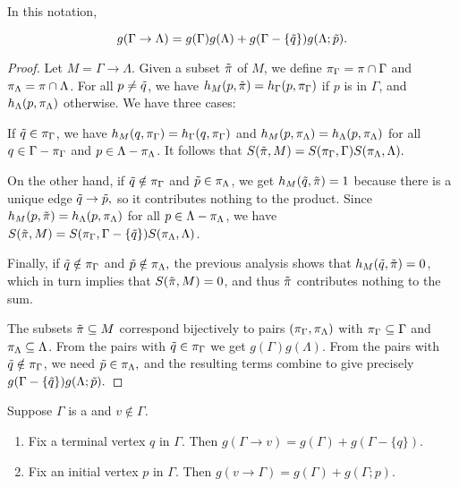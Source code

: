 \begin{prop}
	In this notation, \begin{enumrealm}\begin{equation*} g(\Gamma \rightarrow \Lambda) = g(\Gamma)g(\Lambda) + g(\Gamma - \{\tilde{q}\})g(\Lambda; \tilde{p}).
\end{equation*}\end{enumrealm}
\end{prop}
\begin{proof}
	Let $M = \Gamma \rightarrow \Lambda$.
Given a subset $\tilde{\pi}$ of $M$, we define $\pi_\Gamma = \pi \cap \Gamma$ and $\pi_\Lambda = \pi \cap \Lambda$.
For all $p \neq \tilde{q}$, we have $h_M(p, \tilde{\pi}) = h_\Gamma(p, \pi_\Gamma)$ if $p$ is in $\Gamma$, and $h_\Lambda(p, \pi_\Lambda)$ otherwise.
We have three cases:
	
	
	If $\tilde{q} \in \pi_\Gamma$, we have $h_M(q, \pi_\Gamma) = h_\Gamma(q, \pi_\Gamma)$ and $h_M(p, \pi_\Lambda) = h_\Lambda(p, \pi_\Lambda)$ for all $q \in \Gamma - \pi_\Gamma$ and $p \in \Lambda - \pi_\Lambda$.
It follows that $S(\tilde{\pi}, M) = S(\pi_\Gamma, \Gamma)S(\pi_\Lambda, \Lambda).$
	
	On the other hand, if $\tilde{q}\notin\pi_\Gamma$ and $\tilde{p} \in \pi_\Lambda$, we get $h_M(\tilde{q}, \tilde{\pi}) = 1$ because there is a unique edge $\tilde{q} \rightarrow \tilde{p},$ so it contributes nothing to the product.
Since $h_M(p, \tilde{\pi}) = h_\Lambda(p, \pi_\Lambda)$ for all $p \in \Lambda - \pi_\Lambda$, we have $S(\tilde{\pi}, M) = S(\pi_\Gamma, \Gamma - \{\tilde{q}\})S(\pi_\Lambda, \Lambda)$.
	
	Finally, if $\tilde{q} \notin \pi_\Gamma$ and $\tilde{p}\notin\pi_\Lambda,$ the previous analysis shows that $h_M(\tilde{q}, \tilde{\pi}) = 0$, which in turn implies that $S(\tilde{\pi}, M) = 0$, and thus $\tilde{\pi}$ contributes nothing to the sum.
	
	The subsets $\tilde{\pi} \subseteq M$ correspond bijectively to pairs $(\pi_\Gamma, \pi_\Lambda)$ with $\pi_\Gamma \subseteq \Gamma$ and $\pi_\Lambda \subseteq \Lambda$.
From the pairs with $\tilde{q} \in \pi_\Gamma$ we get $g(\Gamma)g(\Lambda)$.
From the pairs with $\tilde{q} \notin \pi_\Gamma$, we need $\tilde{p} \in \pi_\Lambda,$ and the resulting terms combine to give precisely $g(\Gamma - \{\tilde{q}\})g(\Lambda; \tilde{p}).$
\end{proof}

\begin{cor} Suppose $\Gamma$ is a  and $v \notin \Gamma$.\listspace
	\begin{enumerate} \listspace
		\item Fix a terminal vertex $q$ in $\Gamma$.
Then $g(\Gamma \rightarrow v) = g(\Gamma) + g(\Gamma - \{q\}).$
		\item Fix an initial vertex $p$ in $\Gamma$.
Then $g(v \rightarrow \Gamma) = g(\Gamma) + g(\Gamma; p).$
	\end{enumerate}\textspace
\end{cor}

